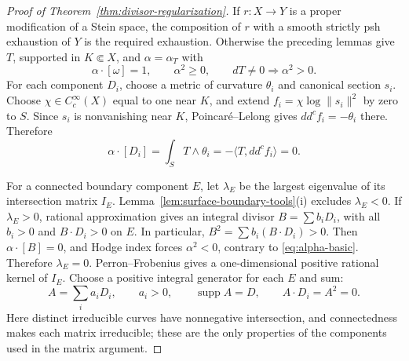 \documentclass[11pt]{amsart}
\theoremstyle{definition}
\theoremstyle{remark}
\numberwithin{equation}{section}
\newcommand{\ddc}{dd^c}
\newcommand{\supp}{\operatorname{supp}}
\begin{document}
\begin{proof}[Proof of Theorem~\ref{thm:divisor-regularization}]
If $r:X\to Y$ is a proper modification of a Stein space, the
composition of $r$ with a smooth strictly psh exhaustion of $Y$
is the required exhaustion. Otherwise the preceding lemmas give $T$, supported
in $K\Subset X$, and $\alpha=\alpha_T$ with
\begin{equation}\label{eq:alpha-basic}
 \alpha\cdot[\omega]=1,\qquad \alpha^2\ge0,
 \qquad dT\ne0\Longrightarrow\alpha^2>0.
\end{equation}
For each component $D_i$, choose a metric of curvature $\theta_i$
and canonical section $s_i$. Choose $\chi\in C_c^\infty(X)$ equal
to one near $K$, and extend
$f_i=\chi\log\|s_i\|^2$ by zero to $S$.
Since $s_i$ is nonvanishing near $K$, Poincar\'e--Lelong gives
$\ddc f_i=-\theta_i$ there. Therefore
\begin{equation}\label{eq:alpha-boundary-orthogonality}
 \alpha\cdot[D_i]=\int_S T\wedge\theta_i
          =-\langle T,\ddc f_i\rangle=0.
\end{equation}

For a connected boundary component $E$, let $\lambda_E$ be the
largest eigenvalue of its intersection matrix $I_E$.
Lemma~\ref{lem:surface-boundary-tools}\textup{(i)} excludes
$\lambda_E<0$. If $\lambda_E>0$, rational approximation gives an
integral divisor $B=\sum b_iD_i$, with all $b_i>0$ and
$B\cdot D_i>0$ on $E$. In particular,
$B^2=\sum b_i(B\cdot D_i)>0$.
Then $\alpha\cdot[B]=0$, and Hodge index forces $\alpha^2<0$,
contrary to \eqref{eq:alpha-basic}. Therefore $\lambda_E=0$.
Perron--Frobenius gives a one-dimensional positive rational kernel
of $I_E$. Choose a positive integral generator for each $E$ and sum:
\begin{equation}\label{eq:full-support-null-divisor}
 A=\sum_i a_iD_i,\qquad a_i>0,\qquad
 \supp A=D,\qquad A\cdot D_i=A^2=0.
\end{equation}
Here distinct irreducible curves have nonnegative intersection, and
connectedness makes each matrix irreducible; these are the only
properties of the components used in the matrix argument.


\end{proof}
\end{document}

